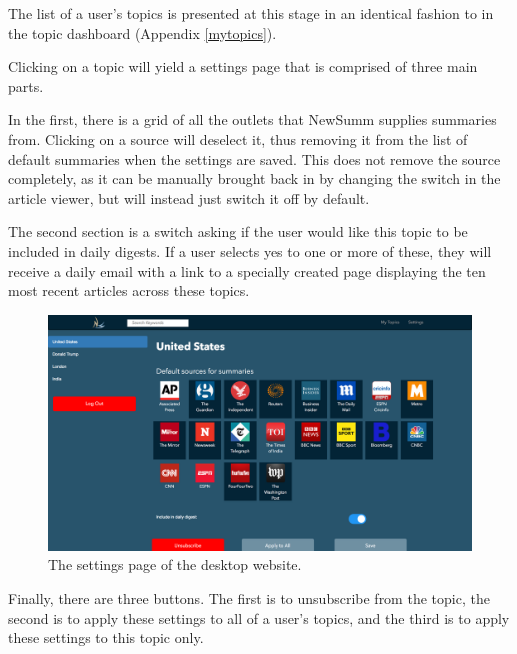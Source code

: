 \documentclass[12pt]{article}
\begin{document}
\begin{appendices}
The list of a user's topics is presented at this stage in an identical fashion to in the topic dashboard (Appendix \ref{mytopics}).

Clicking on a topic will yield a settings page that is comprised of three main parts.

In the first, there is a grid of all the outlets that NewSumm supplies summaries from. Clicking on a source will deselect it, thus removing it from the list of default summaries when the settings are saved. This does not remove the source completely, as it can be manually brought back in by changing the switch in the article viewer, but will instead just switch it off by default.

The second section is a switch asking if the user would like this topic to be included in daily digests. If a user selects yes to one or more of these, they will receive a daily email with a link to a specially created page displaying the ten most recent articles across these topics.

\begin{figure}[ht!]
  \centering
        \includegraphics[width=\textwidth]{desktopsettings.PNG}
        \caption{The settings page of the desktop website.}
   \label{desktopsettings}
\end{figure}

Finally, there are three buttons. The first is to unsubscribe from the topic, the second is to apply these settings to all of a user's topics, and the third is to apply these settings to this topic only.

\end{appendices}


\end{document}

